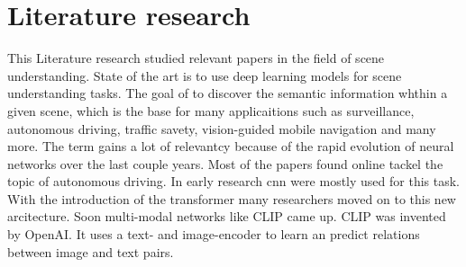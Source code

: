 \chapter{Literature research}

This Literature research studied relevant papers in the field of scene understanding.
State of the art is to use deep learning models for scene understanding tasks.
The goal of to discover the semantic information whthin a given scene, which is the base for many applicaitions such as surveillance, autonomous driving, traffic savety, vision-guided mobile navigation and many more.
The term gains a lot of relevantcy because of the rapid evolution of neural networks over the last couple years.
Most of the papers found online tackel the topic of autonomous driving\cite{sceneunderstandingautdriving1}.
In early research \acrfull{cnn}\cite{SegNet} were mostly used for this task.
With the introduction of the transformer \cite{attentionisallyouneed} many researchers moved on to this new arcitecture.
Soon multi-modal networks like CLIP\cite{clip} came up.
CLIP was invented by OpenAI\cite{openai}.
It uses a text- and image-encoder to learn an predict relations between image and text pairs.

